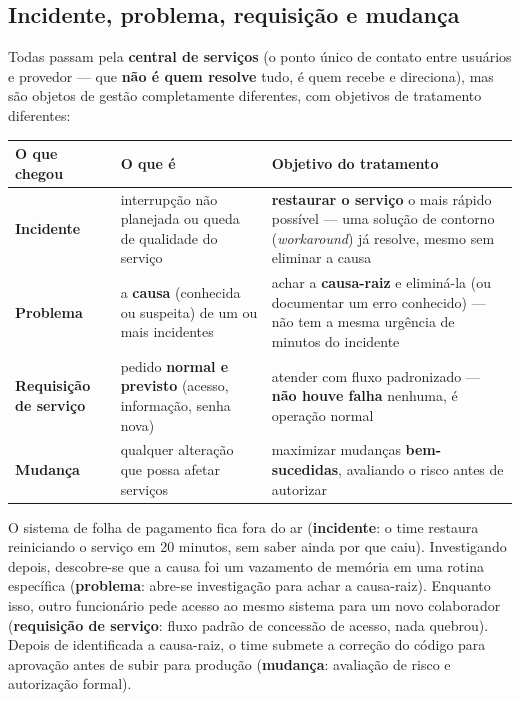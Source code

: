 \subsection{Incidente, problema, requisição e mudança}

\begin{conceito}
Todas passam pela \textbf{central de serviços} (o ponto único de contato
entre usuários e provedor --- que \textbf{não é quem resolve} tudo, é quem
recebe e direciona), mas são objetos de gestão completamente diferentes,
com objetivos de tratamento diferentes:

\begin{center}
\begin{tabular}{@{}p{2.7cm}p{4cm}p{4.6cm}@{}}
\toprule
\textbf{O que chegou} & \textbf{O que é} & \textbf{Objetivo do tratamento} \\
\midrule
\textbf{Incidente} & interrupção não planejada ou queda de qualidade do
serviço & \textbf{restaurar o serviço} o mais rápido possível --- uma
solução de contorno (\textit{workaround}) já resolve, mesmo sem eliminar a
causa \\
\textbf{Problema} & a \textbf{causa} (conhecida ou suspeita) de um ou mais
incidentes & achar a \textbf{causa-raiz} e eliminá-la (ou documentar um
erro conhecido) --- não tem a mesma urgência de minutos do incidente \\
\textbf{Requisição de serviço} & pedido \textbf{normal e previsto} (acesso,
informação, senha nova) & atender com fluxo padronizado --- \textbf{não
houve falha} nenhuma, é operação normal \\
\textbf{Mudança} & qualquer alteração que possa afetar serviços & maximizar
mudanças \textbf{bem-sucedidas}, avaliando o risco antes de autorizar \\
\bottomrule
\end{tabular}
\end{center}
\end{conceito}

\begin{exemplo}
O sistema de folha de pagamento fica fora do ar (\textbf{incidente}: o time
restaura reiniciando o serviço em 20 minutos, sem saber ainda por que caiu).
Investigando depois, descobre-se que a causa foi um vazamento de memória em
uma rotina específica (\textbf{problema}: abre-se investigação para achar a
causa-raiz). Enquanto isso, outro funcionário pede acesso ao mesmo sistema
para um novo colaborador (\textbf{requisição de serviço}: fluxo padrão de
concessão de acesso, nada quebrou). Depois de identificada a causa-raiz, o
time submete a correção do código para aprovação antes de subir para
produção (\textbf{mudança}: avaliação de risco e autorização formal).
\end{exemplo}

